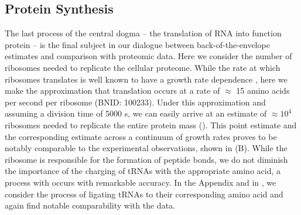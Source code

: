 \subsection{Protein Synthesis}
The last process of the central dogma -- the translation of RNA into function
protein -- is the final subject in our dialogue between back-of-the-envelope
estimates and comparison with proteomic data.
Here we consider the number of ribosomes needed to replicate the cellular
proteome.  While the rate at which ribosomes translates is well known to have a
growth rate dependence \cite{dai2018}, here we make the approximation that
translation occurs at a rate of $\approx$ 15 amino acids per second per ribosome
(BNID: 100233). Under this approximation and assuming a division time of 5000 s,
we can easily arrive at an estimate of $\approx 10^4$ ribosomes needed to
replicate the entire protein mass (). This point estimate
and the corresponding estimate across a continuum of growth rates proves to be
notably comparable to the experimental observations, shown in
(B). While the ribosome is responsible for the formation
of peptide bonds, we do not diminish the importance of the charging of tRNAs
with the appropriate amino acid, a process with occurs with remarkable accuracy.
In the Appendix and in , we consider the
process of ligating tRNAs to their corresponding amino acid and again find
notable comparability with the data.





